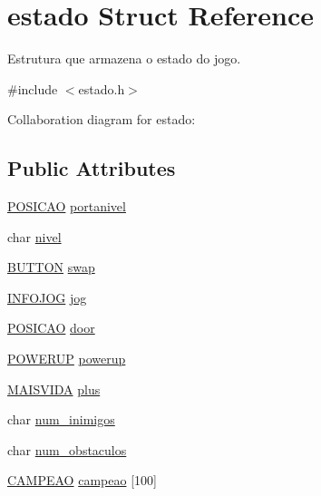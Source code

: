 \hypertarget{structestado}{}\section{estado Struct Reference}
\label{structestado}


Estrutura que armazena o estado do jogo.  




{\ttfamily \#include $<$estado.\+h$>$}



Collaboration diagram for estado\+:
\subsection*{Public Attributes}
\begin{DoxyCompactItemize}
\item 
\hyperlink{estado_8h_a55b3f4b56938eeb8fa5e8f9c07baf1b0}{P\+O\+S\+I\+C\+AO} \hyperlink{structestado_a3c4dc3d28aa17dfdc5048150396e4bdc}{portanivel}
\item 
char \hyperlink{structestado_a620f2f81ebfe4cba1d6e44b09a1762f7}{nivel}
\item 
\hyperlink{estado_8h_a62dca8af1ea0ef89e55ff0182e3dc501}{B\+U\+T\+T\+ON} \hyperlink{structestado_a5f7b606e7ce960d06118ff5916a84f84}{swap}
\item 
\hyperlink{estado_8h_a15843d49c23e10e93db7540fd3a5127a}{I\+N\+F\+O\+J\+OG} \hyperlink{structestado_a2fad6d9b40818f08c6d0d09c34916be1}{jog}
\item 
\hyperlink{estado_8h_a55b3f4b56938eeb8fa5e8f9c07baf1b0}{P\+O\+S\+I\+C\+AO} \hyperlink{structestado_a7415ebf0dc1fbc535407bb2bd669dc81}{door}
\item 
\hyperlink{estado_8h_a67a4a1bb09225ebc3869315583eaa703}{P\+O\+W\+E\+R\+UP} \hyperlink{structestado_a1128015f9f1ad3bc4b63ec8c9e94b48b}{powerup}
\item 
\hyperlink{estado_8h_a251aab7869b437bb291d3053ec3ff663}{M\+A\+I\+S\+V\+I\+DA} \hyperlink{structestado_abce94d44e3c723ada8348def234264be}{plus}
\item 
char \hyperlink{structestado_a6fbc4a80c4f371036f264ecfe27e5f9e}{num\+\_\+inimigos}
\item 
char \hyperlink{structestado_ac1a8a541e2301189833c6f713c416063}{num\+\_\+obstaculos}
\item 
\hyperlink{estado_8h_a7b9c871c7ea5afc5d8b631e22672d679}{C\+A\+M\+P\+E\+AO} \hyperlink{structestado_a3421256c459875e123fd25ea089d3e6e}{campeao} \mbox{[}100\mbox{]}
\item 

\end{DoxyCompactItemize}
